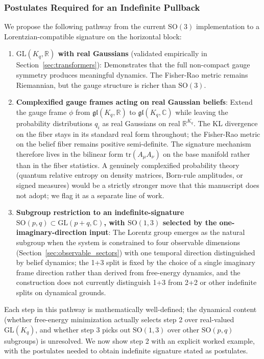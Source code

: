 \documentclass[11pt]{article}
\begin{document}
\subsubsection{Postulates Required for an Indefinite Pullback}

We propose the following pathway from the current $\mathrm{SO}(3)$ implementation to a Lorentzian-compatible signature on the horizontal block:

\begin{enumerate}
\item \textbf{$\mathrm{GL}(K_q, \mathbb{R})$ with real Gaussians} (validated empirically in Section~\ref{sec:transformers}): Demonstrates that the full non-compact gauge symmetry produces meaningful dynamics. The Fisher-Rao metric remains Riemannian, but the gauge structure is richer than $\mathrm{SO}(3)$.

\item \textbf{Complexified gauge frames acting on real Gaussian beliefs}: Extend the gauge frame $\phi$ from $\mathfrak{gl}(K_q, \mathbb{R})$ to $\mathfrak{gl}(K_q, \mathbb{C})$ while leaving the probability distributions $q_i$ as real Gaussians on real $\mathbb{R}^{K_q}$. The KL divergence on the fiber stays in its standard real form throughout; the Fisher-Rao metric on the belief fiber remains positive semi-definite. The signature mechanism therefore lives in the bilinear form $\mathrm{tr}(A_\mu A_\nu)$ on the base manifold rather than in the fiber statistics. A genuinely complexified probability theory (quantum relative entropy on density matrices, Born-rule amplitudes, or signed measures) would be a strictly stronger move that this manuscript does not adopt; we flag it as a separate line of work.

\item \textbf{Subgroup restriction to an indefinite-signature $\mathrm{SO}(p,q) \subset \mathrm{GL}(p{+}q, \mathbb{C})$, with $\mathrm{SO}(1,3)$ selected by the one-imaginary-direction input}: The Lorentz group emerges as the natural subgroup when the system is constrained to four observable dimensions (Section~\ref{sec:observable_sectors}) with one temporal direction distinguished by belief dynamics; the 1+3 split is fixed by the choice of a single imaginary frame direction rather than derived from free-energy dynamics, and the construction does not currently distinguish 1+3 from 2+2 or other indefinite splits on dynamical grounds.
\end{enumerate}

Each step in this pathway is mathematically well-defined; the dynamical content (whether free-energy minimization actually selects step 2 over real-valued $\mathrm{GL}(K_q)$, and whether step 3 picks out $\mathrm{SO}(1,3)$ over other $\mathrm{SO}(p,q)$ subgroups) is unresolved. We now show step 2 with an explicit worked example, with the postulates needed to obtain indefinite signature stated as postulates.
\end{document}
